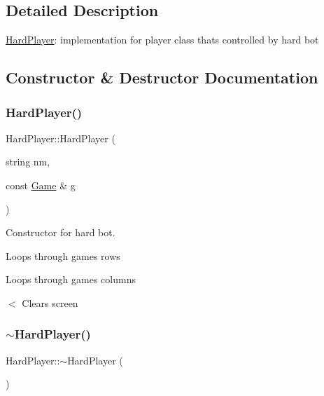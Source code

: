 \subsection{Detailed Description}
\mbox{\hyperlink{class_hard_player}{Hard\+Player}}\+: implementation for player class that\textquotesingle{}s controlled by hard bot 

\subsection{Constructor \& Destructor Documentation}
\mbox{\label{class_hard_player_a37cfa417c531f1988469965a7b4adc9e}} 
\subsubsection{\texorpdfstring{Hard\+Player()}{HardPlayer()}}
{\footnotesize\ttfamily Hard\+Player\+::\+Hard\+Player (\begin{DoxyParamCaption}\item[{string}]{nm,  }\item[{const \mbox{\hyperlink{class_game}{Game}} \&}]{g }\end{DoxyParamCaption})\hspace{0.3cm}{\ttfamily [inline]}}



Constructor for hard bot. 

Loops through game\textquotesingle{}s rows

Loops through games columns

$<$ Clears screen \mbox{\label{class_hard_player_a86f3946384b7ca6c3e92a992b11a0ba8}} 
\subsubsection{\texorpdfstring{$\sim$\+Hard\+Player()}{~HardPlayer()}}
{\footnotesize\ttfamily Hard\+Player\+::$\sim$\+Hard\+Player (\begin{DoxyParamCaption}{ }\end{DoxyParamCaption})\hspace{0.3cm}{\ttfamily [inline]}}



